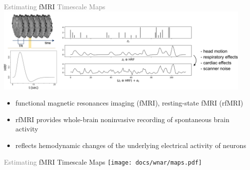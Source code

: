 \documentclass[8pt,aspectratio=169]{beamer}
\begin{document}
\begin{frame}{\textcolor{gray}{Estimating} fMRI \textcolor{gray}{Timescale Maps}}
     \centering\includegraphics[width=0.95\textwidth]{docs/wnar/fmri.pdf}
     \vfill
     \begin{itemize}
         \item functional magnetic resonances imaging (fMRI), resting-state fMRI (rfMRI)
         \item rfMRI provides whole-brain noninvasive recording of spontaneous brain activity 
         \item reflects hemodynamic changes of the underlying electrical activity of neurons
     \end{itemize}
\end{frame}

\begin{frame}{\textcolor{gray}{Estimating} fMRI Timescale Maps}
    \centering\texttt{[image: docs/wnar/maps.pdf]}
\end{frame}
\end{document}
